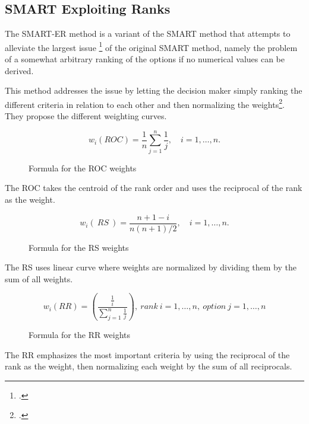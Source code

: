 \subsection{SMART Exploiting Ranks}
\label{smart_er}

The \ac{SMART-ER} method is a variant of the \ac{SMART} method that attempts to alleviate the largest issue \footcitetext[p. 26]{barfodMulticriteriaDecisionAnalysis2014} of the original \ac{SMART} method, 
namely the problem of a somewhat arbitrary ranking of the options if no numerical values can be derived.

This method addresses the issue by letting the decision maker simply ranking the different criteria in relation to each other and then normalizing the weights\footcite[p. 296]{robertsWeightApproximationsMultiattribute2002a}.
They propose the different weighting curves.

\begin{figure}[h]
    \centering
    \[ w_{i}(ROC) = \frac{1}{n} \sum_{j=1}^{n} \frac{1}{j}, \quad i = 1, \ldots, n. \]
    \caption{Formula for the \ac{ROC} weights}
\end{figure}

The \ac{ROC} takes the centroid of the rank order and uses the reciprocal of the rank as the weight.

\begin{figure}[h]
    \centering
    \[ w_{i}(\ RS\ ) = \frac{n + 1 - i}{n(n + 1)/2}, \quad i = 1, \ldots, n. \]
    \caption{Formula for the \ac{RS} weights}
\end{figure}

The \ac{RS} uses linear curve where weights are normalized by dividing them by the sum of all weights.

\begin{figure}[h]
    \centering
    \[ w_i(RR) = \left( \frac{\frac{1}{i}}{\sum_{j=1}^{n} \frac{1}{j}} \right) , \ rank\ i = 1, \ldots, n, \ option\ j = 1, \ldots, n \]
    \caption{Formula for the \ac{RR} weights}
\end{figure}

The \ac{RR} emphasizes the most important criteria by using the reciprocal of the rank as the weight, then normalizing each weight by the sum of all reciprocals.